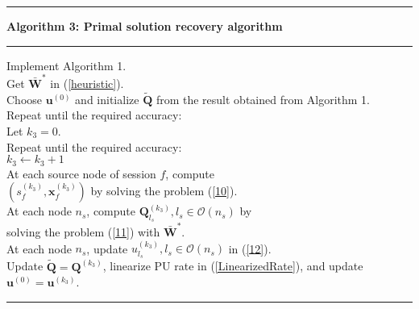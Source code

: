 \documentclass[12pt,onecolumn,tworows]{IEEEtran}
\begin{document}
\noindent\rule{520pt}{1pt}
 \textbf{Algorithm 3: Primal solution recovery algorithm}\\
 \noindent\rule{520pt}{0.65pt}
Implement Algorithm 1.\\
Get ${\mathbf{\bar W}}^*$ in (\ref{heuristic}).\\
Choose ${{\mathbf{u}}^{(0)}}$ and initialize $\tilde{\mathbf{Q}}$ from the result obtained from Algorithm 1.\\
Repeat until the required accuracy:\\
\indent  \indent  Let $k_3=0$. \\
\indent  \indent  Repeat until the required accuracy:\\
\indent  \indent \indent \indent $k_{3} \leftarrow k_{3}+1$\\
\indent  \indent \indent \indent At each source node of session $f$, compute\\
 \indent  \indent \indent \indent $\left({s}_{f}^{(k_{3})},\mathbf{x}_{f}^{(k_{3})}\right)$ by solving the problem (\ref{10}).\\
 \indent  \indent \indent  \indent  At each node $n_s$, compute $\mathbf{Q}_{l_s}^{(k_{3})},l_s\in\mathcal{O}(n_s)$
 by \\
 \indent  \indent \indent \indent solving the problem (\ref{11}) with ${\mathbf{\bar W}}^*$.\\
 \indent  \indent \indent  \indent  At each node $n_s$, update $u_{l_s}^{(k_{3})}, l_s\in\mathcal{O}(n_s)$ in (\ref{12}).\\
\indent \indent Update ${\mathbf{\tilde Q}} = {{\mathbf{Q}}^{(k_3)}}$, linearize PU rate in (\ref{LinearizedRate}), and update\\
\indent  \indent ${{\mathbf{u}}^{(0)}}={{\mathbf{u}}^{(k_3)}}$.\\
 \noindent\rule{520pt}{1pt}
\end{document}
